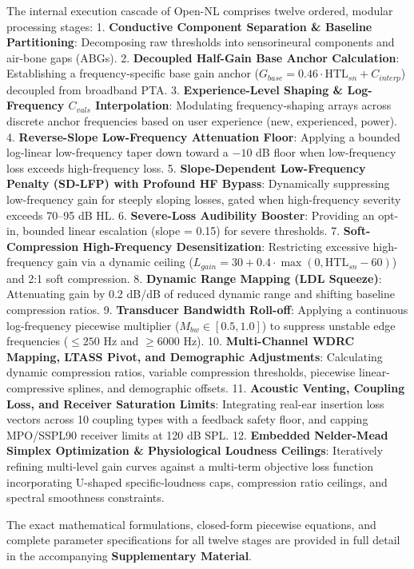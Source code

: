 \documentclass[
  12pt,
]{article}
\begin{document}
The internal execution cascade of Open-NL comprises twelve ordered,
modular processing stages: 1. \textbf{Conductive Component Separation \&
Baseline Partitioning}: Decomposing raw thresholds into sensorineural
components and air-bone gaps (ABGs). 2. \textbf{Decoupled Half-Gain Base
Anchor Calculation}: Establishing a frequency-specific base gain anchor
(\(G_{base} = 0.46 \cdot \text{HTL}_{sn} + C_{interp}\)) decoupled from
broadband PTA. 3. \textbf{Experience-Level Shaping \& Log-Frequency
\(C_{vals}\) Interpolation}: Modulating frequency-shaping arrays across
discrete anchor frequencies based on user experience (new, experienced,
power). 4. \textbf{Reverse-Slope Low-Frequency Attenuation Floor}:
Applying a bounded log-linear low-frequency taper down toward a \(-10\)
dB floor when low-frequency loss exceeds high-frequency loss. 5.
\textbf{Slope-Dependent Low-Frequency Penalty (SD-LFP) with Profound HF
Bypass}: Dynamically suppressing low-frequency gain for steeply sloping
losses, gated when high-frequency severity exceeds 70--95 dB HL. 6.
\textbf{Severe-Loss Audibility Booster}: Providing an opt-in, bounded
linear escalation (slope = 0.15) for severe thresholds. 7.
\textbf{Soft-Compression High-Frequency Desensitization}: Restricting
excessive high-frequency gain via a dynamic ceiling
(\(L_{gain} = 30 + 0.4 \cdot \max(0, \text{HTL}_{sn} - 60)\)) and 2:1
soft compression. 8. \textbf{Dynamic Range Mapping (LDL Squeeze)}:
Attenuating gain by 0.2 dB/dB of reduced dynamic range and shifting
baseline compression ratios. 9. \textbf{Transducer Bandwidth Roll-off}:
Applying a continuous log-frequency piecewise multiplier
(\(M_{bw} \in [0.5, 1.0]\)) to suppress unstable edge frequencies
(\(\le 250\) Hz and \(\ge 6000\) Hz). 10. \textbf{Multi-Channel WDRC
Mapping, LTASS Pivot, and Demographic Adjustments}: Calculating dynamic
compression ratios, variable compression thresholds, piecewise
linear-compressive splines, and demographic offsets. 11.
\textbf{Acoustic Venting, Coupling Loss, and Receiver Saturation
Limits}: Integrating real-ear insertion loss vectors across 10 coupling
types with a feedback safety floor, and capping MPO/SSPL90 receiver
limits at 120 dB SPL. 12. \textbf{Embedded Nelder-Mead Simplex
Optimization \& Physiological Loudness Ceilings}: Iteratively refining
multi-level gain curves against a multi-term objective loss function
incorporating U-shaped specific-loudness caps, compression ratio
ceilings, and spectral smoothness constraints.

The exact mathematical formulations, closed-form piecewise equations,
and complete parameter specifications for all twelve stages are provided
in full detail in the accompanying \textbf{Supplementary Material}.
\end{document}
